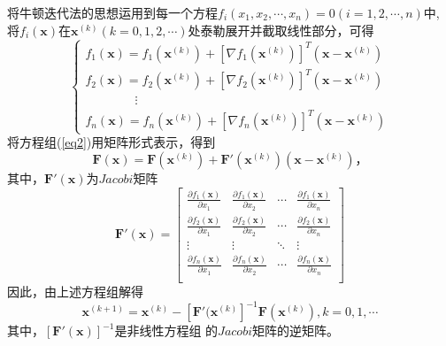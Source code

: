 \documentclass[UTF8,a4paper,12pt]{ctexart}
\begin{document}
   将牛顿迭代法的思想运用到每一个方程${f}_i({x}_1,{x}_2,\cdots,{x}_n)=0(i=1,2,\cdots,n)$中,
   将${f}_i(\boldsymbol{x})$在$\boldsymbol{x}^{(k)}(k=0,1,2,\cdots)$处泰勒展开并截取线性部分，可得
   \begin{equation} \label{eq2}
	   \begin{cases}
		   {f}_1(\boldsymbol{x})={f}_1(\boldsymbol{x}^{(k)})+[\nabla{f}_1(\boldsymbol{x}^{(k)})]^{T}(\boldsymbol{x}-\boldsymbol{x}^{(k)})\\
		   {f}_2(\boldsymbol{x})={f}_2(\boldsymbol{x}^{(k)})+[\nabla{f}_2(\boldsymbol{x}^{(k)})]^{T}(\boldsymbol{x}-\boldsymbol{x}^{(k)})\\
		   \qquad \qquad \vdots\\
		   {f}_n(\boldsymbol{x})={f}_n(\boldsymbol{x}^{(k)})+[\nabla{f}_n(\boldsymbol{x}^{(k)})]^{T}(\boldsymbol{x}-\boldsymbol{x}^{(k)})
	   \end{cases}	
   \end{equation}
   将方程组(\ref{eq2})用矩阵形式表示，得到
   \begin{displaymath}
	   \boldsymbol{F}(\boldsymbol{x})=\boldsymbol{F}(\boldsymbol{x}^{(k)})
	   +\boldsymbol{F}'(\boldsymbol{x}^{(k)})(\boldsymbol{x}-\boldsymbol{x}^{(k)})，
   \end{displaymath}
   其中，$\boldsymbol{F}'(\boldsymbol{x})$为$Jacobi$矩阵
   \begin{equation*}
	   \boldsymbol{F}'(\boldsymbol{x})=\begin{bmatrix}
		   \frac{\partial{f}_1(\boldsymbol{x})}{\partial{x}_1}
		   & \frac{\partial{f}_1(\boldsymbol{x})}{\partial{x}_2}
		   & \cdots
		   & \frac{\partial{f}_1(\boldsymbol{x})}{\partial{x}_n}\\
   
		   \frac{\partial{f}_2(\boldsymbol{x})}{\partial{x}_1}
		   & \frac{\partial{f}_2(\boldsymbol{x})}{\partial{x}_2}
		   & \cdots
		   & \frac{\partial{f}_2(\boldsymbol{x})}{\partial{x}_n}\\
   
   
		   \vdots
		   & \vdots
		   & \ddots
		   & \vdots\\
   
		   \frac{\partial{f}_n(\boldsymbol{x})}{\partial{x}_1}
		   & \frac{\partial{f}_n(\boldsymbol{x})}{\partial{x}_2}
		   & \cdots
		   & \frac{\partial{f}_n(\boldsymbol{x})}{\partial{x}_n}\\
	   \end{bmatrix}
   \end{equation*}
   因此，由上述方程组解得
   \begin{equation} \label{eq3}
	   \boldsymbol{x}^{(k+1)}=\boldsymbol{x}^{(k)}-[\boldsymbol{F}'(\boldsymbol{x}^{(k)}]^{-1}
	   \boldsymbol{F}(\boldsymbol{x}^{(k)}),k=0,1,\cdots
   \end{equation}
   其中，$[\boldsymbol{F}'(\boldsymbol{x})]^{-1}$是非线性方程组
   的$Jacobi$矩阵的逆矩阵。
   
\end{document}
